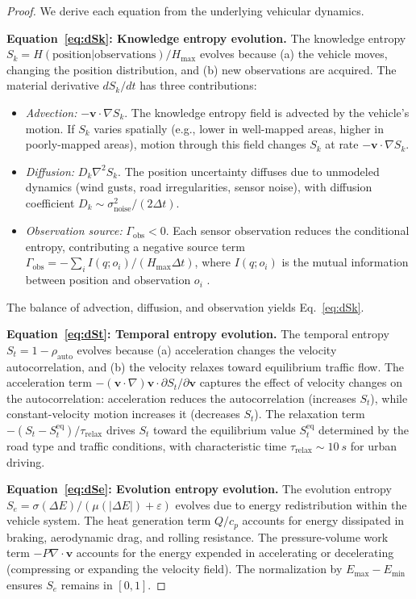 \documentclass[twocolumn,10pt]{article}
\newcommand{\Sk}{S_k}
\newcommand{\St}{S_t}
\newcommand{\Se}{S_e}
\newcommand{\trelax}{\tau_{\mathrm{relax}}}
\newcommand{\Emax}{E_{\mathrm{max}}}
\newcommand{\Emin}{E_{\mathrm{min}}}
\newcommand{\Hmax}{H_{\mathrm{max}}}
\begin{document}
\begin{proof}
We derive each equation from the underlying vehicular dynamics.

\textbf{Equation~\eqref{eq:dSk}: Knowledge entropy evolution.} The knowledge entropy $\Sk = H(\text{position}|\text{observations})/\Hmax$ evolves because (a) the vehicle moves, changing the position distribution, and (b) new observations are acquired. The material derivative $d\Sk/dt$ has three contributions:
\begin{itemize}
    \item \emph{Advection:} $-\mathbf{v} \cdot \nabla \Sk$. The knowledge entropy field is advected by the vehicle's motion. If $\Sk$ varies spatially (e.g., lower in well-mapped areas, higher in poorly-mapped areas), motion through this field changes $\Sk$ at rate $-\mathbf{v} \cdot \nabla \Sk$.
    \item \emph{Diffusion:} $D_k \nabla^2 \Sk$. The position uncertainty diffuses due to unmodeled dynamics (wind gusts, road irregularities, sensor noise), with diffusion coefficient $D_k \sim \sigma_{\mathrm{noise}}^2 / (2\Delta t)$.
    \item \emph{Observation source:} $\Gamma_{\mathrm{obs}} < 0$. Each sensor observation reduces the conditional entropy, contributing a negative source term $\Gamma_{\mathrm{obs}} = -\sum_i I(q; o_i) / (\Hmax \Delta t)$, where $I(q; o_i)$ is the mutual information between position and observation $o_i$ \cite{shannon1948, cover2006}.
\end{itemize}
The balance of advection, diffusion, and observation yields Eq.~\eqref{eq:dSk}.

\textbf{Equation~\eqref{eq:dSt}: Temporal entropy evolution.} The temporal entropy $\St = 1 - \rho_{\mathrm{auto}}$ evolves because (a) acceleration changes the velocity autocorrelation, and (b) the velocity relaxes toward equilibrium traffic flow. The acceleration term $-(\mathbf{v} \cdot \nabla)\mathbf{v} \cdot \partial \St / \partial \mathbf{v}$ captures the effect of velocity changes on the autocorrelation: acceleration reduces the autocorrelation (increases $\St$), while constant-velocity motion increases it (decreases $\St$). The relaxation term $-(\St - \St^{\mathrm{eq}})/\trelax$ drives $\St$ toward the equilibrium value $\St^{\mathrm{eq}}$ determined by the road type and traffic conditions, with characteristic time $\trelax \sim \SI{10}{s}$ for urban driving.

\textbf{Equation~\eqref{eq:dSe}: Evolution entropy evolution.} The evolution entropy $\Se = \sigma(\Delta E)/(\mu(|\Delta E|) + \varepsilon)$ evolves due to energy redistribution within the vehicle system. The heat generation term $Q/c_p$ accounts for energy dissipated in braking, aerodynamic drag, and rolling resistance. The pressure-volume work term $-P\nabla \cdot \mathbf{v}$ accounts for the energy expended in accelerating or decelerating (compressing or expanding the velocity field). The normalization by $\Emax - \Emin$ ensures $\Se$ remains in $[0,1]$.
\end{proof}
\end{document}
